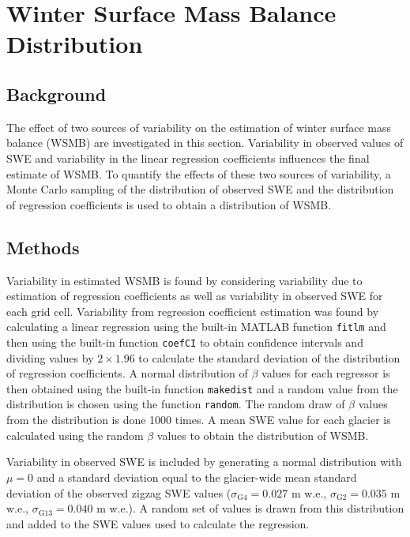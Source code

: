\documentclass[12pt]{article}
\begin{document}
\section{Winter Surface Mass Balance Distribution}
\label{sec:WSMBdistribution}

\subsection{Background}

The effect of two sources of variability on the estimation of winter surface mass balance (WSMB) are investigated in this section. Variability in observed values of SWE and variability in the linear regression coefficients influences the final estimate of WSMB. To quantify the effects of these two sources of variability, a Monte Carlo sampling of the distribution of observed SWE and the distribution of regression coefficients is used to obtain a distribution of WSMB.  


\subsection{Methods}

Variability in estimated WSMB is found by considering variability due to estimation of regression coefficients as well as variability in observed SWE for each grid cell. Variability from regression coefficient estimation was found by calculating a linear regression using the built-in MATLAB function \texttt{fitlm} and then using the built-in function \texttt{coefCI} to obtain confidence intervals and dividing values by $2\times 1.96$ to calculate the standard deviation of the distribution of regression coefficients. A normal distribution of $\beta$ values for each regressor is then obtained using the built-in function \texttt{makedist} and a random value from the distribution is chosen using the function \texttt{random}. The random draw of $\beta$ values from the distribution is done 1000 times. A mean SWE value for each glacier is calculated using the random $\beta$ values to obtain the distribution of WSMB.

Variability in observed SWE is included by generating a normal distribution with $\mu=0$ and a standard deviation equal to the glacier-wide mean standard deviation of the observed zigzag SWE values ($\sigma_{\mathrm{G4}} = 0.027 $ m w.e., $\sigma_{\mathrm{G2}} = 0.035$ m w.e., $\sigma_{\mathrm{G13}} = 0.040 $ m w.e.). A random set of values is drawn from this distribution and added to the SWE values used to calculate the regression. 
\end{document}

